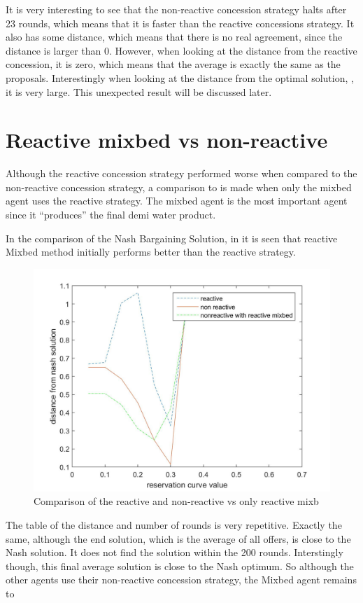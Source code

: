 It is very interesting to see that the non-reactive concession strategy halts after 23 rounds, which means that it is faster than the reactive concessions strategy. It also has some distance, which means that there is no real agreement, since the distance is larger than 0. However, when looking at the distance from the reactive concession, it is zero, which means that the average is exactly the same as the proposals. Interestingly when looking at the distance from the optimal solution, , it is very large. This unexpected result will be discussed later. 
\section{Reactive mixbed vs non-reactive }
Although the reactive concession strategy performed worse when compared to the non-reactive concession strategy, a comparison to is made when only the mixbed agent uses the reactive strategy. The mixbed agent is the most important agent since it ``produces'' the final demi water product.

In the comparison of the Nash Bargaining Solution, in  it is seen that reactive Mixbed  method initially performs better than the reactive strategy. 


\begin{figure}[h]
	\centering
	\includegraphics[width=0.9\linewidth]{img/reactivevsnonreactivevsmixbedrea}
	\caption{Comparison of the reactive and non-reactive vs only reactive mixb}
	\label{fig:reactivevsnon-reactivevsnon-reactivemxbrea}
\end{figure}

The table of the distance and number of rounds is very repetitive. Exactly the same, although the end solution, which is the average of all offers, is close to the Nash solution. It does not find the solution within the 200 rounds. Interstingly though, this final average solution is close to the Nash optimum. So although the other agents use their non-reactive concession strategy, the Mixbed agent remains to 

